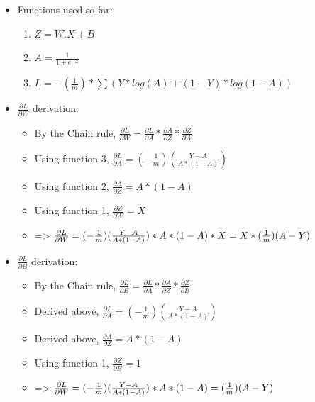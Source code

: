 \documentclass[10pt,a4paper]{article}
\begin{document}
\begin{itemize}
    \item Functions used so far:
    \begin{enumerate}
        \item $Z = W . X + B$
        \item $A = \frac{1}{1+e^{-Z}}$
        \item $L = -(\frac{1}{m}) * \sum(Y * log(A) + (1-Y) * log(1-A))$
    \end{enumerate}
    \item $\frac{\partial{L}}{\partial{W}}$ derivation:
    \begin{itemize}
        \item By the Chain rule, $\frac{\partial{L}}{\partial{W}} = \frac{\partial{L}}{\partial{A}} * \frac{\partial{A}}{\partial{Z}} * \frac{\partial{Z}}{\partial{W}}$
        \item Using function 3, $\frac{\partial{L}}{\partial{A}} = (-\frac{1}{m})(\frac{Y-A}{A * (1-A)})$
        \item Using function 2, $\frac{\partial{A}}{\partial{Z}} = A * (1-A)$
        \item Using function 1, $\frac{\partial{Z}}{\partial{W}} = X$
        \item => $\frac{\partial{L}}{\partial{W}} = (-\frac{1}{m})(\frac{Y-A}{A * (1-A)}) * A * (1-A) * X\\
              = X * (\frac{1}{m})(A-Y)$
    \end{itemize}
    \item $\frac{\partial{L}}{\partial{B}}$ derivation:
    \begin{itemize}
        \item By the Chain rule, $\frac{\partial{L}}{\partial{B}} = \frac{\partial{L}}{\partial{A}} * \frac{\partial{A}}{\partial{Z}} * \frac{\partial{Z}}{\partial{B}}$
        \item Derived above, $\frac{\partial{L}}{\partial{A}} = (-\frac{1}{m})(\frac{Y-A}{A * (1-A)})$
        \item Derived above, $\frac{\partial{A}}{\partial{Z}} = A * (1-A)$
        \item Using function 1, $\frac{\partial{Z}}{\partial{B}} = 1$
        \item => $\frac{\partial{L}}{\partial{W}} = (-\frac{1}{m})(\frac{Y-A}{A * (1-A)}) * A * (1-A)\\
              = (\frac{1}{m})(A-Y)$
    \end{itemize}
\end{itemize}
\end{document}
